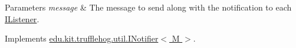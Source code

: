 \begin{DoxyParams}{Parameters}
{\em message} & The message to send along with the notification to each \hyperlink{interfaceedu_1_1kit_1_1trufflehog_1_1util_1_1_i_listener}{I\+Listener}. \\
\hline
\end{DoxyParams}


Implements \hyperlink{interfaceedu_1_1kit_1_1trufflehog_1_1util_1_1_i_notifier_a8e9907d8ae194d5f59af215d61a7b3dc}{edu.\+kit.\+trufflehog.\+util.\+I\+Notifier$<$ M $>$}.

